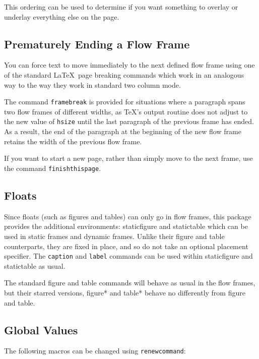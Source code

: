 \documentclass[a4paper]{article}
\newcommand{\env}[1]{\textsf{#1}}
\newcommand{\cmdname}[1]{\texttt{\symbol{92}#1}}
\begin{document}
This ordering can be used to determine if you want something
to overlay or underlay everything else on the page. 

\subsection{Prematurely Ending a Flow Frame}

You can force text to move immediately to the next defined
flow frame using one of the standard \LaTeX\ page breaking commands
which  work in an analogous way to the way they
work in standard two column mode. 

The command \cmdname{framebreak} is provided for situations
where a paragraph spans two flow frames
of different widths, as \TeX's output routine does not 
adjust to the new value of \cmdname{hsize} until the last 
paragraph of the previous frame has ended. As a 
result, the end of the paragraph at the beginning of the new
flow frame retains the width of the previous flow frame.

If you want to start a new page, rather than simply move to the 
next frame, use the command\newline
\cmdname{finishthispage}.

\subsection{Floats}

Since floats (such as figures and tables) can only go in 
{flow frames}, this package provides
the additional environments: 
\env{staticfigure} and  
\env{statictable} which can be used in static frames
and dynamic frames. Unlike their \env{figure} and
\env{table} counterparts, they are fixed in place, and
so do not take an optional placement specifier. The 
\cmdname{caption} and \cmdname{label} commands can 
be used within \env{staticfigure} and \env{statictable} as
usual.

The standard \env{figure} and \env{table} commands will 
behave as usual in the flow frames, but their starred versions,
\env{figure*} and \env{table*} behave no differently
from \env{figure} and \env{table}.

\subsection{Global Values}

The following macros can be changed using \cmdname{renewcommand}:
\end{document}
